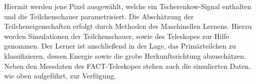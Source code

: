 Hiermit werden jene Pixel ausgewählt, welche ein Tscherenkow-Signal enthalten und die Teilchenschauer parametrisiert. Die Abschätzung der Teilcheneigenschaften erfolgt durch Methoden des Maschinellen Lernens. Hierzu werden Simulationen der Teilchenschauer, sowie des Teleskopes zur Hilfe genommen. Der Lerner ist anschließend in der Lage, das Primärteilchen zu klassifizieren, dessen Energie sowie die grobe Herkunftsrichtung abzuschätzen.
Neben den Messdaten des FACT-Teleskopes stehen auch die simulierten Daten, wie oben aufgeführt, zur Verfügung.